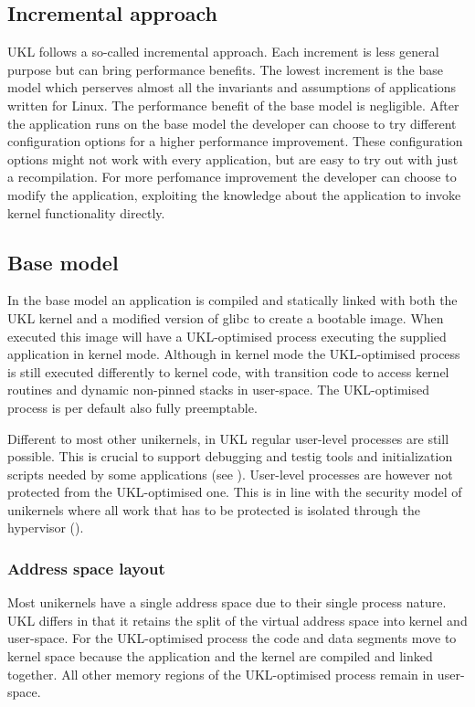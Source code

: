 \documentclass[10pt,twocolumn,a4paper]{article}
\begin{document}
  \subsection{Incremental approach}
    UKL follows a so-called incremental approach. 
    Each increment is less general purpose but can bring performance benefits.
    The lowest increment is the base model which perserves almost all the 
    invariants and assumptions of applications written for Linux.
    The performance benefit of the base model is negligible.
    After the application runs on the base model the developer can choose to try different
    configuration options for a higher performance improvement.
    These configuration options might not work with every application, but are easy to try out
    with just a recompilation.
    For more perfomance improvement the developer can choose to modify the application, exploiting the
    knowledge about the application to invoke kernel functionality directly.

  \subsection{Base model}\label{sec:base-model}
    In the base model an application is compiled and statically linked with both 
    the UKL kernel and a modified version of glibc to create a bootable image.
    When executed this image will have a UKL-optimised process executing the supplied 
    application in kernel mode.
    Although in kernel mode the UKL-optimised process is still executed differently to kernel code,
    with transition code to access kernel routines and dynamic non-pinned stacks in user-space.
    The UKL-optimised process is per default also fully preemptable.

    Different to most other unikernels, in UKL regular user-level processes are still possible.
    This is crucial to support debugging and testig tools and initialization scripts needed by
    some applications (see ).
    User-level processes are however not protected from the UKL-optimised one.
    This is in line with the security model of unikernels where all work that has to 
    be protected is isolated through the hypervisor ().

    \subsubsection{Address space layout}
      Most unikernels have a single address space due to their single process nature.
      UKL differs in that it retains the split of the virtual address space into kernel and user-space.
      For the UKL-optimised process the code and data segments move to kernel space because
      the application and the kernel are compiled and linked together.
      All other memory regions of the UKL-optimised process remain in user-space.
\end{document}
